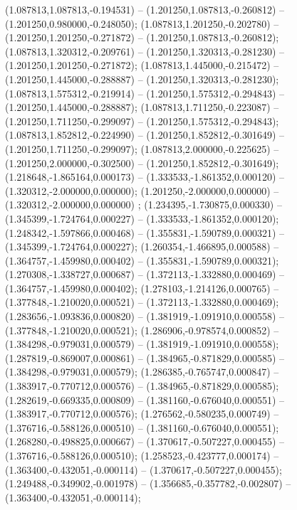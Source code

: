  (1.087813,1.087813,-0.194531) -- (1.201250,1.087813,-0.260812) -- (1.201250,0.980000,-0.248050);
 (1.087813,1.201250,-0.202780) -- (1.201250,1.201250,-0.271872) -- (1.201250,1.087813,-0.260812);
 (1.087813,1.320312,-0.209761) -- (1.201250,1.320313,-0.281230) -- (1.201250,1.201250,-0.271872);
 (1.087813,1.445000,-0.215472) -- (1.201250,1.445000,-0.288887) -- (1.201250,1.320313,-0.281230);
 (1.087813,1.575312,-0.219914) -- (1.201250,1.575312,-0.294843) -- (1.201250,1.445000,-0.288887);
 (1.087813,1.711250,-0.223087) -- (1.201250,1.711250,-0.299097) -- (1.201250,1.575312,-0.294843);
 (1.087813,1.852812,-0.224990) -- (1.201250,1.852812,-0.301649) -- (1.201250,1.711250,-0.299097);
 (1.087813,2.000000,-0.225625) -- (1.201250,2.000000,-0.302500) -- (1.201250,1.852812,-0.301649);
 (1.218648,-1.865164,0.000173) -- (1.333533,-1.861352,0.000120) -- (1.320312,-2.000000,0.000000);
 (1.201250,-2.000000,0.000000) -- (1.320312,-2.000000,0.000000) ;
 (1.234395,-1.730875,0.000330) -- (1.345399,-1.724764,0.000227) -- (1.333533,-1.861352,0.000120);
 (1.248342,-1.597866,0.000468) -- (1.355831,-1.590789,0.000321) -- (1.345399,-1.724764,0.000227);
 (1.260354,-1.466895,0.000588) -- (1.364757,-1.459980,0.000402) -- (1.355831,-1.590789,0.000321);
 (1.270308,-1.338727,0.000687) -- (1.372113,-1.332880,0.000469) -- (1.364757,-1.459980,0.000402);
 (1.278103,-1.214126,0.000765) -- (1.377848,-1.210020,0.000521) -- (1.372113,-1.332880,0.000469);
 (1.283656,-1.093836,0.000820) -- (1.381919,-1.091910,0.000558) -- (1.377848,-1.210020,0.000521);
 (1.286906,-0.978574,0.000852) -- (1.384298,-0.979031,0.000579) -- (1.381919,-1.091910,0.000558);
 (1.287819,-0.869007,0.000861) -- (1.384965,-0.871829,0.000585) -- (1.384298,-0.979031,0.000579);
 (1.286385,-0.765747,0.000847) -- (1.383917,-0.770712,0.000576) -- (1.384965,-0.871829,0.000585);
 (1.282619,-0.669335,0.000809) -- (1.381160,-0.676040,0.000551) -- (1.383917,-0.770712,0.000576);
 (1.276562,-0.580235,0.000749) -- (1.376716,-0.588126,0.000510) -- (1.381160,-0.676040,0.000551);
 (1.268280,-0.498825,0.000667) -- (1.370617,-0.507227,0.000455) -- (1.376716,-0.588126,0.000510);
 (1.258523,-0.423777,0.000174) -- (1.363400,-0.432051,-0.000114) -- (1.370617,-0.507227,0.000455);
 (1.249488,-0.349902,-0.001978) -- (1.356685,-0.357782,-0.002807) -- (1.363400,-0.432051,-0.000114);
